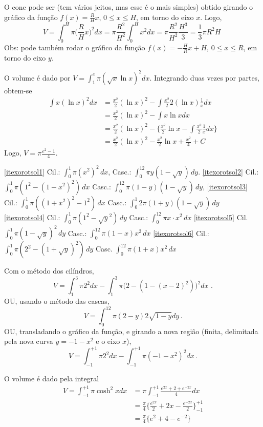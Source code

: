 \begin{Solution}{10.9}
O cone pode ser (tem vários jeitos, mas esse é o mais simples)
obtido girando o gráfico da função $f(x)=\frac{R}{H}x$, $0\leq x\leq H$, em
torno do eixo $x$. Logo,
$$
V=\int_0^H\pi\big(\frac{R}{H}x\Big)^2dx=\pi\frac{R^2}{H^2}\int_0^Hx^2dx=
\pi\frac{R^2}{H^2}\frac{H^3}{3}=\frac{1}{3}\pi R^2H \,\,$$
Obs: pode também rodar o gráfico da função $f(x)=-\frac{H}{R}x+H$, $0\leq x\leq
R$, em torno do eixo $y$.
\end{Solution}
\begin{Solution}{10.10}
O volume é dado por $V=\int_1^e\pi(\sqrt{x}\ln x)^2dx$. Integrando duas vezes
por partes, obtem-se
\begin{align*}
\int x(\ln x)^2dx&=\frac{x^2}{2}(\ln x)^2-\int \frac{x^2}{2}2(\ln
x)\frac{1}{x}dx\\
&=\frac{x^2}{2}(\ln x)^2-\int x\ln xdx\\
&=\frac{x^2}{2}(\ln x)^2-\big\{\frac{x^2}{2}\ln x-\int\frac{x^2}{2}\frac{1}{x}dx
\big\}\\
&=\frac{x^2}{2}(\ln x)^2-\frac{x^2}{2}\ln x+\frac{x^2}{4}+C
\end{align*}
Logo, $V=\pi\frac{e^2-1}{4}$.
\end{Solution}
\begin{Solution}{10.11}
\eqref{itexorotsol1}
Cil.: $\int_0^1\pi (x^2)^2\,dx$,
Casc.:
$\int_0^12\pi y(1-\sqrt{y})\,dy$.
\eqref{itexorotsol2}
Cil.: $\int_0^1\pi(1^2-(1-x^2)^2)\,dx$
Casc.: $\int_0^12\pi(1-y)(1-\sqrt{y})\,dy$,
\eqref{itexorotsol3}
Cil.: $\int_0^1\pi((1+x^2)^2-1^2)\,dx$
Casc.: $\int_0^1 2\pi(1+y)(1-\sqrt{y})\,dy$
\eqref{itexorotsol4}
Cil.: $\int_0^1\pi(1^2-\sqrt{y}^2)\,dy$
Casc.: $\int_0^12\pi x\cdot x^2\,dx$
\eqref{itexorotsol5}
Cil. $\int_0^1\pi(1-\sqrt{y})^2\,dy$
Casc.: $\int_0^12\pi(1-x)x^2\,dx$
\eqref{itexorotsol6}
Cil.: $\int_0^1\pi(2^2-(1+\sqrt{y})^2)\,dy$
Casc. $\int_0^12\pi(1+x)x^2\,dx$
\end{Solution}
\begin{Solution}{10.12}
Com o método dos cilíndros,
$$V=\int_1^3\pi 2^2dx-\int_1^3\pi\big(2-(1-(x-2)^2)\big)^2dx\,\,.$$
OU, usando o método das cascas,
$$
V=\int_0^12\pi(2-y)2\sqrt{1-y}dy\,.
$$
OU, transladando o gráfico da função, e girando a nova região (finita,
delimitada pela nova curva $y=-1-x^2$ e o eixo $x$),
$$V=\int_{-1}^{+1}\pi 2^2dx-\int_{-1}^{+1}\pi(-1-x^2)^2dx\,.$$
\end{Solution}
\begin{Solution}{10.13}
O volume é dado pela integral
\begin{align*}
V=\int_{-1}^{+1}\pi \cosh^2xdx&=\pi\int_{-1}^{+1}\frac{e^{2x}+2+e^{-2x}}{4}dx\\
&=\frac{\pi}{4}\Big\{
\frac{e^{2x}}{2}+2x-\frac{e^{-2x}}{2}
\Big\}_{-1}^{+1}\\
&=\frac{\pi}{4}\big\{e^2+4-e^{-2}\big\}
\end{align*}
\end{Solution}
